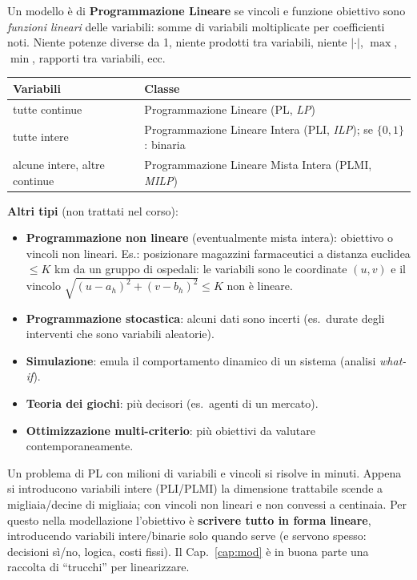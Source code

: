 \begin{defbox}
Un modello è di \textbf{Programmazione Lineare} se vincoli e funzione obiettivo sono \emph{funzioni lineari} delle variabili: somme di variabili moltiplicate per coefficienti noti. Niente potenze diverse da 1, niente prodotti tra variabili, niente $|\cdot|$, $\max$, $\min$, rapporti tra variabili, ecc.
\end{defbox}

\begin{center}
\begin{tabular}{@{}ll@{}}
\toprule
Variabili & Classe \\ \midrule
tutte continue & Programmazione Lineare (PL, \emph{LP})\\
tutte intere & Programmazione Lineare Intera (PLI, \emph{ILP}); se $\{0,1\}$: binaria\\
alcune intere, altre continue & Programmazione Lineare Mista Intera (PLMI, \emph{MILP})\\
\bottomrule
\end{tabular}
\end{center}

\textbf{Altri tipi} (non trattati nel corso):
\begin{itemize}[nosep]
  \item \textbf{Programmazione non lineare} (eventualmente mista intera): obiettivo o vincoli non lineari. Es.: posizionare magazzini farmaceutici a distanza euclidea $\le K$ km da un gruppo di ospedali: le variabili sono le coordinate $(u,v)$ e il vincolo $\sqrt{(u-a_h)^2+(v-b_h)^2}\le K$ non è lineare.
  \item \textbf{Programmazione stocastica}: alcuni dati sono incerti (es.\ durate degli interventi che sono variabili aleatorie).
  \item \textbf{Simulazione}: emula il comportamento dinamico di un sistema (analisi \emph{what-if}).
  \item \textbf{Teoria dei giochi}: più decisori (es.\ agenti di un mercato).
  \item \textbf{Ottimizzazione multi-criterio}: più obiettivi da valutare contemporaneamente.
\end{itemize}

\begin{oss}
Un problema di PL con milioni di variabili e vincoli si risolve in minuti. Appena si introducono variabili intere (PLI/PLMI) la dimensione trattabile scende a migliaia/decine di migliaia; con vincoli non lineari e non convessi a centinaia. Per questo nella modellazione l'obiettivo è \textbf{scrivere tutto in forma lineare}, introducendo variabili intere/binarie solo quando serve (e servono spesso: decisioni sì/no, logica, costi fissi). Il Cap.~\ref{cap:mod} è in buona parte una raccolta di ``trucchi'' per linearizzare.
\end{oss}

